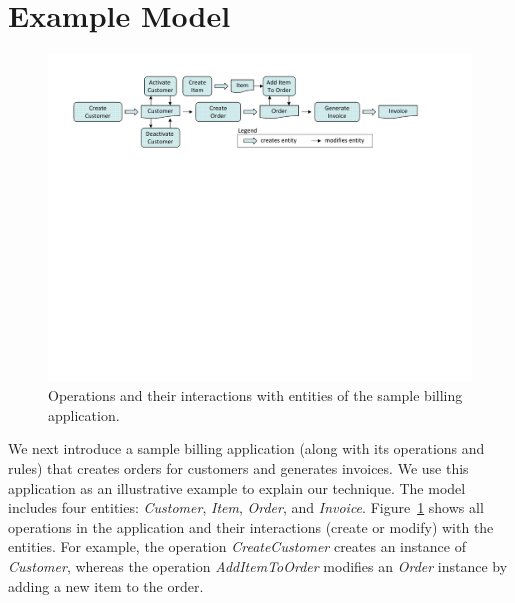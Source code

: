 \section{Example Model}

\begin{figure}
\centering
\includegraphics[trim=45 435 40 38,clip,width=7.5in]{figs/appModel.pdf}
\caption{Operations and their interactions with entities of the sample billing application.}
\label{fig:sample-app}
\end{figure}

We next introduce a sample billing application (along with its operations and
rules) that creates orders for customers and generates invoices. We use this
application as an illustrative example to explain our technique. The model
includes four entities: \textit{Customer}, \textit{Item}, \textit{Order}, and
\textit{Invoice}.  Figure~\ref{fig:sample-app} shows all operations in the
application and their interactions (create or modify) with the entities.  For
example, the operation \textit{CreateCustomer} creates an instance of
\textit{Customer}, whereas the operation \textit{AddItemToOrder} modifies an
\textit{Order} instance by adding a new item to the order.

